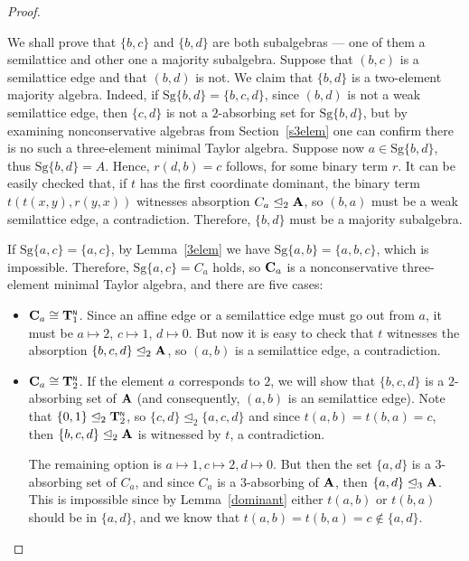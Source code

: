 \documentclass[11pt]{amsart}
\newcommand{\m}[1]{\mathbf{\uppercase{#1}}}
\newcommand{\n}{\scriptscriptstyle{\mathsf{N}}}
\theoremstyle{definition}
\theoremstyle{remark}
\theoremstyle{plain}
\begin{document}
\begin{proof}
\begin{enumerate}[wide, labelwidth=!,itemindent=!,labelindent=0pt]
\begin{enumerate}[wide, labelwidth=!,labelindent=0pt,itemindent=!]
\begin{enumerate}[wide, labelwidth=!,labelindent=0pt,itemindent=!]
We shall prove that $\{b,c\}$ and $\{b,d\}$ are both subalgebras --- one of them a semilattice and other one a majority subalgebra. Suppose that $(b,c)$ is a semilattice edge and that $(b,d)$ is not. We claim that $\{b,d\}$ is a two-element majority algebra. Indeed, if $\mathrm{Sg}\{b,d\}=\{b,c,d\}$, since $(b,d)$ is not a weak semilattice edge, then $\{c,d\}$ is not a $2$-absorbing set for $\mathrm{Sg}\{b,d\}$, but by examining nonconservative algebras from Section~\ref{s3elem} one can confirm there is no such a three-element minimal Taylor algebra. Suppose now $a\in \mathrm{Sg}\{b,d\}$, thus $\mathrm{Sg}\{b,d\}=A$. Hence, $r(d,b)=c$ follows, for some binary term $r$. It can be easily checked that, if $t$ has the first coordinate dominant, the binary term $t(t(x,y),r(y,x))$ witnesses absorption $C_a\trianglelefteq_2\m a$, so $(b,a)$ must be a weak semilattice edge, a contradiction. Therefore, $\{b,d\}$ must be a majority subalgebra.


If $\mathrm{Sg}\{a,c\}=\{a,c\}$, by Lemma~\ref{3elem} we have $\mathrm{Sg}\{a,b\}=\{a,b,c\}$, which is impossible. Therefore, $\mathrm{Sg}\{a,c\}=C_a$ holds, so $\m c_a$ is a nonconservative three-element minimal Taylor algebra, and there are five cases:
\begin{itemize}[leftmargin=*]
\item $\m C_a\cong {\m T}_1^{\n}$. Since an affine edge or a semilattice edge must go out from $a$, it must be $a\mapsto 2$, $c\mapsto 1$, $d\mapsto 0$. But now it is easy to check that $t$ witnesses the absorption $\{b,c,d\}\trianglelefteq_2\m a$, so $(a,b)$ is a semilattice edge, a contradiction.

\item $\m C_a\cong {\m T}_2^{\n}$. If the element $a$ corresponds to $2$, we will show that $\{b,c,d\}$ is a $2$-absorbing set of ${\m A}$ (and consequently, $(a,b)$ is an semilattice edge). Note that $\{0,1\}\trianglelefteq_2 \m T_2^{\n}$, so $\{c,d\}\trianglelefteq_2 \{a,c,d\}$ and since $t(a,b)=t(b,a)=c$, then $\{b,c,d\}\trianglelefteq_2\m a$ is witnessed by $t$, a contradiction.

The remaining option is $a\mapsto 1, c\mapsto 2, d\mapsto 0$. But then the set $\{a,d\}$ is a $3$-absorbing set of $C_a$, and since $C_a$ is a $3$-absorbing of ${\m A}$, then $\{a,d\}\trianglelefteq_3{\m A}$. This is impossible since by Lemma~\ref{dominant} either $t(a,b)$ or $t(b,a)$ should be in $\{a,d\}$, and we know that $t(a,b)=t(b,a)=c\notin\{a,d\}$.


\end{itemize}
\end{enumerate}
\end{enumerate}
\end{enumerate}
\end{proof}
\end{document}
